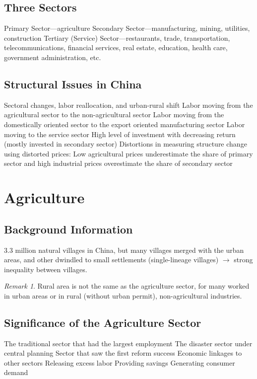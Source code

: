 \documentclass[11pt]{article}
\theoremstyle{definition}
\theoremstyle{remark}
\newtheorem*{remark}{Remark}
\begin{document}
\subsection{Three Sectors}
\begin{outline}[enumerate]
\1 Primary Sector---agriculture
\1 Secondary Sector---manufacturing, mining, utilities, construction
\1 Tertiary (Service) Sector---restaurants, trade, transportation, telecommunications, financial services, real estate, education, health care, government administration, etc.
\end{outline}

\subsection{Structural Issues in China}
\begin{outline}[enumerate]
\1 Sectoral changes, labor reallocation, and urban-rural shift
	\2 Labor moving from the agricultural sector to the non-agricultural sector
	\2 Labor moving from the domestically oriented sector to the export oriented manufacturing sector
	\2 Labor moving to the service sector
\1 High level of investment with decreasing return (mostly invested in secondary sector)
\1 Distortions in measuring structure change using distorted prices:
	\2 Low agricultural prices underestimate the share of primary sector and high industrial prices overestimate the share of secondary sector
\end{outline}

\section{Agriculture}
\subsection{Background Information}
3.3 million natural villages in China, but many villages merged with the urban areas, and other dwindled to small settlements (single-lineage villages) $\to$ strong inequality between villages.

\begin{remark}
Rural area is not the same as the agriculture sector, for many worked in urban areas or in rural (without urban permit), non-agricultural industries.
\end{remark}

\subsection{Significance of the Agriculture Sector}
\begin{outline}[enumerate]
\1 The traditional sector that had the largest employment
\1 The disaster sector under central planning
\1 Sector that saw the first reform success
\1 Economic linkages to other sectors
	\2 Releasing excess labor 
	\2 Providing savings 
	\2 Generating consumer demand
\end{outline}
\end{document}
